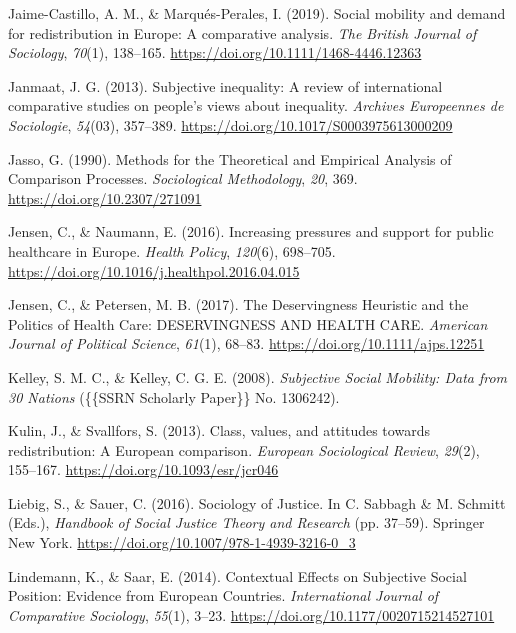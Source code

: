 \documentclass[
  12pt,
]{book}
\newlength{\cslhangindent}
\newlength{\cslentryspacingunit} %
\newenvironment{CSLReferences}[2] %
 {%
  \setlength{\parindent}{0pt}
  \ifodd #1
  \let\oldpar\par
  \def\par{\hangindent=\cslhangindent\oldpar}
  \fi
  \setlength{\parskip}{#2\cslentryspacingunit}
 }%
 {}
\begin{document}
\begin{CSLReferences}{1}{0}
\leavevmode{}%
Jaime-Castillo, A. M., \& Marqués-Perales, I. (2019). Social mobility and demand for redistribution in {Europe}: A comparative analysis. \emph{The British Journal of Sociology}, \emph{70}(1), 138--165. \url{https://doi.org/10.1111/1468-4446.12363}

\leavevmode{}%
Janmaat, J. G. (2013). Subjective inequality: {A} review of international comparative studies on people's views about inequality. \emph{Archives Europeennes de Sociologie}, \emph{54}(03), 357--389. \url{https://doi.org/10.1017/S0003975613000209}

\leavevmode{}%
Jasso, G. (1990). Methods for the {Theoretical} and {Empirical Analysis} of {Comparison Processes}. \emph{Sociological Methodology}, \emph{20}, 369. \url{https://doi.org/10.2307/271091}

\leavevmode{}%
Jensen, C., \& Naumann, E. (2016). Increasing pressures and support for public healthcare in {Europe}. \emph{Health Policy}, \emph{120}(6), 698--705. \url{https://doi.org/10.1016/j.healthpol.2016.04.015}

\leavevmode{}%
Jensen, C., \& Petersen, M. B. (2017). The {Deservingness Heuristic} and the {Politics} of {Health Care}: {DESERVINGNESS AND HEALTH CARE}. \emph{American Journal of Political Science}, \emph{61}(1), 68--83. \url{https://doi.org/10.1111/ajps.12251}

\leavevmode{}%
Kelley, S. M. C., \& Kelley, C. G. E. (2008). \emph{Subjective {Social Mobility}: {Data} from 30 {Nations}} (\{\{SSRN Scholarly Paper\}\} No. 1306242).

\leavevmode{}%
Kulin, J., \& Svallfors, S. (2013). Class, values, and attitudes towards redistribution: {A European} comparison. \emph{European Sociological Review}, \emph{29}(2), 155--167. \url{https://doi.org/10.1093/esr/jcr046}

\leavevmode{}%
Liebig, S., \& Sauer, C. (2016). Sociology of {Justice}. In C. Sabbagh \& M. Schmitt (Eds.), \emph{Handbook of {Social Justice Theory} and {Research}} (pp. 37--59). {Springer New York}. \url{https://doi.org/10.1007/978-1-4939-3216-0_3}

\leavevmode{}%
Lindemann, K., \& Saar, E. (2014). Contextual {Effects} on {Subjective Social Position}: {Evidence} from {European Countries}. \emph{International Journal of Comparative Sociology}, \emph{55}(1), 3--23. \url{https://doi.org/10.1177/0020715214527101}


\end{CSLReferences}
\end{document}
